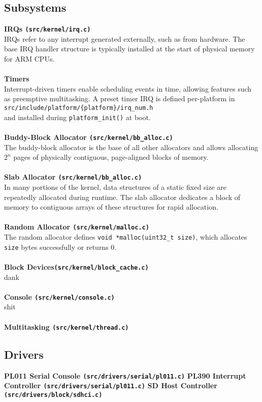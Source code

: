 \documentclass[a4paper,12pt]{refrep}
\newcommand{\code}[1]{\colorbox{light-gray}{\texttt{#1}}}
\begin{document}
\newpage
\subsection{Subsystems}
{\bf IRQs {\bf \code{(src/kernel/irq.c)}}} \\
IRQs refer to any interrupt generated externally, such as from hardware.
The base IRQ handler structure is typically installed at the start of physical memory for ARM CPUs.
\\
\\
{\bf Timers } \\
Interrupt-driven timers enable scheduling events in time, allowing features such as preemptive multitasking.
A preset timer IRQ is defined per-platform in \\ \code{src/include/platform/\{platform\}/irq\_num.h} \\ and installed during \code{platform\_init()} at boot.
\\
\\
{\bf Buddy-Block Allocator {\bf \code{(src/kernel/bb\_alloc.c)}}} \\
The buddy-block allocator is the base of all other allocators and allows allocating $2^n$ pages of physically contiguous, page-aligned blocks of memory. 
\\
\\
{\bf Slab Allocator {\bf \code{(src/kernel/bb\_alloc.c)}}} \\
In many portions of the kernel, data structures of a 
static fixed size are repeatedly allocated during runtime. 
The slab allocator dedicates a block of memory to contiguous 
arrays of these structures for rapid allocation.
\\
\\
{\bf Random Allocator {\bf \code{(src/kernel/malloc.c)}}} \\
The random allocator defines \code{void *malloc(uint32\_t size)}, which allocates \code{size} bytes successfully or returns 0. 
\\
\\
{\bf Block Devices{\bf \code{(src/kernel/block\_cache.c)}}}
\\
dank
\\
\\
{\bf Console {\bf \code{(src/kernel/console.c)}}}
\\
shit
\\
\\
{\bf Multitasking {\bf \code{(src/kernel/thread.c)}}}




\subsection{Drivers}
{\bf PL011 Serial Console {\bf \code{(src/drivers/serial/pl011.c)}}}
{\bf PL390 Interrupt Controller {\bf \code{(src/drivers/serial/pl011.c)}}}
{\bf SD Host Controller {\bf \code{(src/drivers/block/sdhci.c)}}}
\end{document}
